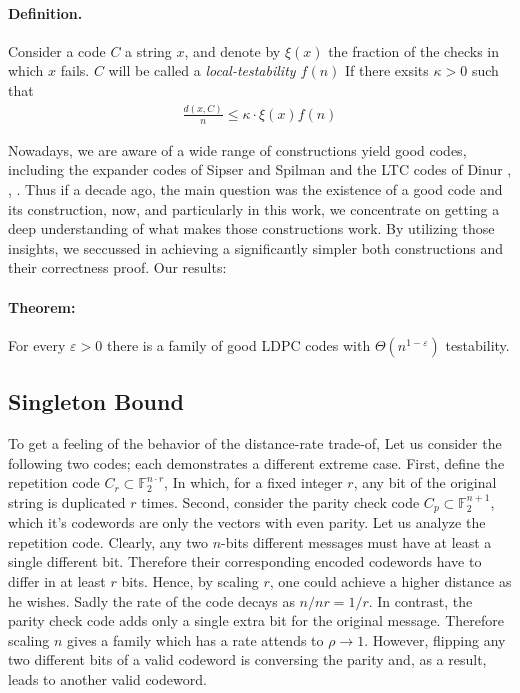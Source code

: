 \documentclass{article}
\begin{document}
\begin{multicols*}{2}
\paragraph{Definition.} Consider a code $C$  a string $x$, and denote by $\xi\left( x \right)$ the fraction of the checks in which $x$ fails. $C$ will be called a \textit{local-testability $f\left( n \right)$} If there exsits $\kappa > 0$ such that 
\begin{equation*}
  \begin{split}
    \frac{d\left( x, C \right)}{n} \le \kappa \cdot  \xi\left( x \right) f\left( n \right)
  \end{split}
\end{equation*}



Nowadays, we are aware of a wide range of constructions yield good codes, including the expander codes of Sipser and Spilman \cite{ExpanderCodes} and the LTC codes of Dinur \cite{Dinur}, \cite{Pavel}, \cite{leverrier2022quantum}. Thus if a decade ago, the main question was the existence of a good code and its construction, now, and particularly in this work, we concentrate on getting a deep understanding of what makes those constructions work. By utilizing those insights, we seccussed in achieving a significantly simpler both constructions and their correctness proof. Our results: 

\paragraph{Theorem:} For every $\varepsilon > 0 $ there is a family of good LDPC codes with $\Theta\left( n^{1-\varepsilon} \right)$ testability.     

\subsection{Singleton Bound}  
To get a feeling of the behavior of the distance-rate trade-of, Let us consider the following two codes; each demonstrates a different extreme case. First, define the repetition code $C_{r} \subset \mathbb{F}_{2}^{n \cdot r}$, In which, for a fixed integer $r$, any bit of the original string is duplicated $r$ times. Second, consider the parity check code $C_{p} \subset \mathbb{F}_{2}^{n+1}$, which it's codewords are only the vectors with even parity. Let us analyze the repetition code. Clearly, any two $n$-bits different messages must have at least a single different bit. Therefore their corresponding encoded codewords have to differ in at least $r$ bits. Hence, by scaling $r$, one could achieve a higher distance as he wishes. Sadly the rate of the code decays as $n/nr = 1/r$. In contrast, the parity check code adds only a single extra bit for the original message. Therefore scaling $n$ gives a family which has a rate attends to $\rho \rightarrow 1$. However, flipping any two different bits of a valid codeword is conversing the parity and, as a result, leads to another valid codeword.


\end{multicols*}
\end{document}

